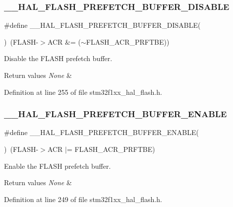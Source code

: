 \subsubsection{\texorpdfstring{\+\_\+\+\_\+\+H\+A\+L\+\_\+\+F\+L\+A\+S\+H\+\_\+\+P\+R\+E\+F\+E\+T\+C\+H\+\_\+\+B\+U\+F\+F\+E\+R\+\_\+\+D\+I\+S\+A\+B\+LE}{\_\_HAL\_FLASH\_PREFETCH\_BUFFER\_DISABLE}}
{\footnotesize\ttfamily \#define \+\_\+\+\_\+\+H\+A\+L\+\_\+\+F\+L\+A\+S\+H\+\_\+\+P\+R\+E\+F\+E\+T\+C\+H\+\_\+\+B\+U\+F\+F\+E\+R\+\_\+\+D\+I\+S\+A\+B\+LE(\begin{DoxyParamCaption}{ }\end{DoxyParamCaption})~(F\+L\+A\+SH-\/$>$A\+CR \&= ($\sim$F\+L\+A\+S\+H\+\_\+\+A\+C\+R\+\_\+\+P\+R\+F\+T\+BE))}



Disable the F\+L\+A\+SH prefetch buffer. 


\begin{DoxyRetVals}{Return values}
{\em None} & \\
\hline
\end{DoxyRetVals}


Definition at line 255 of file stm32f1xx\+\_\+hal\+\_\+flash.\+h.

\mbox{\label{group___f_l_a_s_h___prefetch_gad36059641057f824516303ea92734e6f}} 
\subsubsection{\texorpdfstring{\+\_\+\+\_\+\+H\+A\+L\+\_\+\+F\+L\+A\+S\+H\+\_\+\+P\+R\+E\+F\+E\+T\+C\+H\+\_\+\+B\+U\+F\+F\+E\+R\+\_\+\+E\+N\+A\+B\+LE}{\_\_HAL\_FLASH\_PREFETCH\_BUFFER\_ENABLE}}
{\footnotesize\ttfamily \#define \+\_\+\+\_\+\+H\+A\+L\+\_\+\+F\+L\+A\+S\+H\+\_\+\+P\+R\+E\+F\+E\+T\+C\+H\+\_\+\+B\+U\+F\+F\+E\+R\+\_\+\+E\+N\+A\+B\+LE(\begin{DoxyParamCaption}{ }\end{DoxyParamCaption})~(F\+L\+A\+SH-\/$>$A\+CR $\vert$= F\+L\+A\+S\+H\+\_\+\+A\+C\+R\+\_\+\+P\+R\+F\+T\+BE)}



Enable the F\+L\+A\+SH prefetch buffer. 


\begin{DoxyRetVals}{Return values}
{\em None} & \\
\hline
\end{DoxyRetVals}


Definition at line 249 of file stm32f1xx\+\_\+hal\+\_\+flash.\+h.

